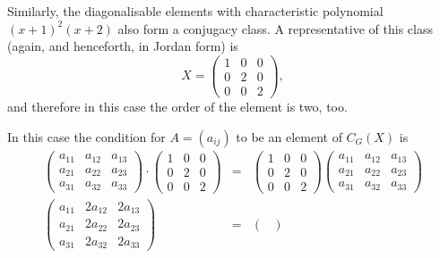 \documentclass[11pt]{article} \usepackage{amssymb}
\begin{document}
\begin{enumerate}
\begin{enumerate}
\begin{itemize}
        Similarly, the diagonalisable elements with characteristic polynomial 
        $(x+1)^2(x+2)$ also form a conjugacy class. A representative of this 
        class (again, and henceforth, in Jordan form) is
        \begin{equation*}
          X=
          \begin{pmatrix}
            1&0  &0 \\ 
            0&2  &0 \\ 
            0&0  &2 
          \end{pmatrix},
        \end{equation*}
        and therefore in this case the order of the element is two, too.
        
        In this case the condition for $A=(a_{ij})$ to be an element of $C_G(X)$
        is
        \begin{eqnarray*}
          \begin{pmatrix}
            a_{11}&a_{12}  &a_{13} \\ 
            a_{21}&a_{22}  &a_{23} \\ 
            a_{31}&a_{32}  &a_{33} 
          \end{pmatrix}
          \cdot
          \begin{pmatrix}
            1&0  &0 \\ 
            0&2  &0 \\ 
            0&0  &2 
          \end{pmatrix}
          &=&
          \begin{pmatrix}
            1&0  &0 \\ 
            0&2  &0 \\ 
            0&0  &2 
          \end{pmatrix}
          \begin{pmatrix}
            a_{11}&a_{12}  &a_{13} \\ 
            a_{21}&a_{22}  &a_{23} \\ 
            a_{31}&a_{32}  &a_{33} 
          \end{pmatrix}
          \\
          \begin{pmatrix}
            a_{11}&2a_{12}  &2a_{13} \\ 
            a_{21}&2a_{22}  &2a_{23} \\ 
            a_{31}&2a_{32}  &2a_{33} 
          \end{pmatrix}
          &=&
          \begin{pmatrix}

\end{pmatrix}
\end{eqnarray*}
\end{itemize}
\end{enumerate}
\end{enumerate}
\end{document}
